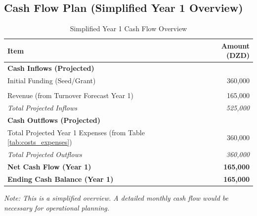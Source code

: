 \subsection{Cash Flow Plan (Simplified Year 1 Overview)}
\begin{table}[H]
  \centering
  \caption{Simplified Year 1 Cash Flow Overview}
  \label{tab:cash_flow_year1}
  \begin{tabularx}{\linewidth}{@{} X r @{}}
    \toprule
    \rowcolor{Gray}\textbf{Item} & \textbf{Amount (DZD)} \\
    \midrule
    \textbf{Cash Inflows (Projected)} & \\
    \quad Initial Funding (Seed/Grant) & 360,000 \\\\ %
    \quad Revenue (from Turnover Forecast Year 1) & 165,000 \\
    \quad \textit{Total Projected Inflows} & \textit{525,000} \\
    \midrule
    \textbf{Cash Outflows (Projected)} & \\
    \quad Total Projected Year 1 Expenses (from Table \ref{tab:costs_expenses}) & 360,000 \\
    \quad \textit{Total Projected Outflows} & \textit{360,000} \\
    \midrule
    \rowcolor{Gray}\textbf{Net Cash Flow (Year 1)} & \textbf{165,000} \\
    \rowcolor{Gray}\textbf{Ending Cash Balance (Year 1)} & \textbf{165,000} \\
    \bottomrule
  \end{tabularx}
  \footnotesize{\textit{Note: This is a simplified overview. A detailed monthly cash flow would be necessary for operational planning.}}
\end{table}

